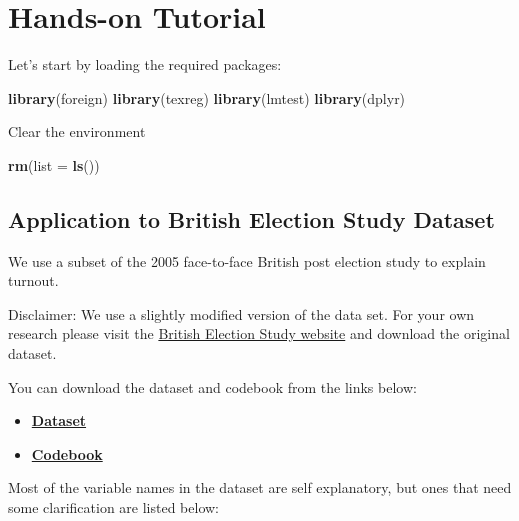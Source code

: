 \documentclass[]{article}
\newenvironment{Shaded}{\begin{snugshade}}{\end{snugshade}}
\newcommand{\KeywordTok}[1]{\textcolor[rgb]{0.13,0.29,0.53}{\textbf{{#1}}}}
\newcommand{\DataTypeTok}[1]{\textcolor[rgb]{0.13,0.29,0.53}{{#1}}}
\newcommand{\NormalTok}[1]{{#1}}
\providecommand{\tightlist}{%
  \setlength{\itemsep}{0pt}\setlength{\parskip}{0pt}}
\theoremstyle{definition}
\theoremstyle{definition}
\theoremstyle{remark}
\begin{document}
\section{Hands-on Tutorial}\label{hands-on-tutorial}

Let's start by loading the required packages:

\begin{Shaded}
\begin{Highlighting}[]
\KeywordTok{library}\NormalTok{(foreign) }
\KeywordTok{library}\NormalTok{(texreg) }
\KeywordTok{library}\NormalTok{(lmtest)}
\KeywordTok{library}\NormalTok{(dplyr)}
\end{Highlighting}
\end{Shaded}

Clear the environment

\begin{Shaded}
\begin{Highlighting}[]
\KeywordTok{rm}\NormalTok{(}\DataTypeTok{list =} \KeywordTok{ls}\NormalTok{())}
\end{Highlighting}
\end{Shaded}

\subsection{Application to British Election Study
Dataset}\label{application-to-british-election-study-dataset}

We use a subset of the 2005 face-to-face British post election study to
explain turnout.

Disclaimer: We use a slightly modified version of the data set. For your
own research please visit the
\href{http://www.britishelectionstudy.com}{British Election Study
website} and download the original dataset.

You can download the dataset and codebook from the links below:

\begin{itemize}
\tightlist
\item
  \textbf{\href{http://uclspp.github.io/PUBLG100/data/bes.dta}{Dataset}}
\item
  \textbf{\href{http://uclspp.github.io/PUBLG100/data/bes_codebook.txt}{Codebook}}
\end{itemize}

Most of the variable names in the dataset are self explanatory, but ones
that need some clarification are listed below:
\end{document}
